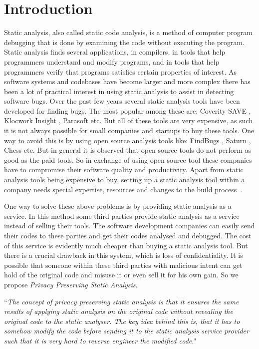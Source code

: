 \documentclass[conference]{IEEEtran}
\begin{document}
\section{Introduction}
Static analysis, also called static code analysis, is a method of computer program debugging that is done by examining the code without executing the program. Static analysis finds 
several applications, in compilers, in tools that help programmers understand and modify programs, and in tools that help programmers verify that programs satisfies certain 
properties of interest. As software systems and codebases have become larger and more complex there has been a lot of practical interest in using static analysis to assist in 
detecting software bugs. Over the past few years several static analysis tools have been developed for finding bugs. The most popular among these are: Coverity SAVE \cite{coverity},
Klocwork Insight \cite{klocwork}, Parasoft \cite{parasoft} etc. But all of these tools are very expensive, as such it is not always possible for small companies and startups to buy
these tools. One way to avoid this is by using open source analysis tools like: FindBugs \cite{findbugs}, Saturn \cite{saturn}, Chess \cite{chess} etc. But in general it is observed
that open source tools do not perform as good as the paid tools. So in exchange of using open source tool these companies have to compromise their software quality and productivity. 
Apart from static analysis tools being expensive to buy, setting up a static analysis tool within a company needs special expertise, resources and changes to the build process~\cite{fse13,
billionlinesofcode}.
 
One way to solve these above problems is by providing static analysis as a service. In this method some third parties provide static analysis as a service instead of selling their tools.
The software development companies can easily send their codes to these parties and get their codes analysed and debugged. The cost of this service is evidently much cheaper than 
buying a static analysis tool. But there is a crucial drawback in this system, which is loss of confidentiality. It is possible that someone within these third parties with malicious 
intent can get hold of the original code and misuse it or even sell it for his own gain. So we propose {\em Privacy Preserving Static Analysis}. 

``{\em The concept of privacy preserving static analysis is that it ensures the same results of applying static analysis on the original code without revealing the original code to 
the static analyser. The key idea behind this is, that it has to somehow modify the code before sending it to the static analysis service provider such that it is very hard to reverse 
engineer the modified code}."
\end{document}
